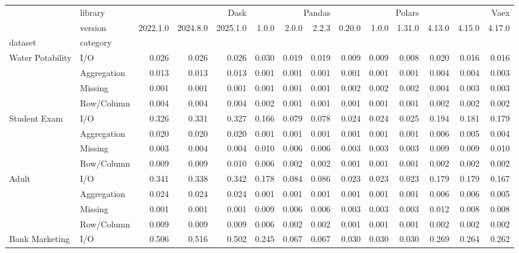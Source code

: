 \begin{tabular}{llrrrrrrrrrrrr}
\toprule
 & library & \multicolumn{3}{r}{Dask} & \multicolumn{3}{r}{Pandas} & \multicolumn{3}{r}{Polars} & \multicolumn{3}{r}{Vaex} \\
 & version & 2022.1.0 & 2024.8.0 & 2025.1.0 & 1.0.0 & 2.0.0 & 2.2.3 & 0.20.0 & 1.0.0 & 1.31.0 & 4.13.0 & 4.15.0 & 4.17.0 \\
dataset & category &  &  &  &  &  &  &  &  &  &  &  &  \\
\midrule
\multirow[t]{4}{*}{Water Potability} & I/O & 0.026 & 0.026 & 0.026 & 0.030 & 0.019 & 0.019 & 0.009 & 0.009 & 0.008 & 0.020 & 0.016 & 0.016 \\
 & Aggregation & 0.013 & 0.013 & 0.013 & 0.001 & 0.001 & 0.001 & 0.001 & 0.001 & 0.001 & 0.004 & 0.004 & 0.003 \\
 & Missing & 0.001 & 0.001 & 0.001 & 0.001 & 0.001 & 0.001 & 0.002 & 0.002 & 0.002 & 0.004 & 0.003 & 0.003 \\
 & Row/Column & 0.004 & 0.004 & 0.004 & 0.002 & 0.001 & 0.001 & 0.001 & 0.001 & 0.001 & 0.002 & 0.002 & 0.002 \\
\cline{1-14}
\multirow[t]{4}{*}{Student Exam} & I/O & 0.326 & 0.331 & 0.327 & 0.166 & 0.079 & 0.078 & 0.024 & 0.024 & 0.025 & 0.194 & 0.181 & 0.179 \\
 & Aggregation & 0.020 & 0.020 & 0.020 & 0.001 & 0.001 & 0.001 & 0.001 & 0.001 & 0.001 & 0.006 & 0.005 & 0.004 \\
 & Missing & 0.003 & 0.004 & 0.004 & 0.010 & 0.006 & 0.006 & 0.003 & 0.003 & 0.003 & 0.009 & 0.009 & 0.010 \\
 & Row/Column & 0.009 & 0.009 & 0.010 & 0.006 & 0.002 & 0.002 & 0.001 & 0.001 & 0.001 & 0.002 & 0.002 & 0.002 \\
\cline{1-14}
\multirow[t]{4}{*}{Adult} & I/O & 0.341 & 0.338 & 0.342 & 0.178 & 0.084 & 0.086 & 0.023 & 0.023 & 0.023 & 0.179 & 0.179 & 0.167 \\
 & Aggregation & 0.024 & 0.024 & 0.024 & 0.001 & 0.001 & 0.001 & 0.001 & 0.001 & 0.001 & 0.006 & 0.006 & 0.005 \\
 & Missing & 0.001 & 0.001 & 0.001 & 0.009 & 0.006 & 0.006 & 0.003 & 0.003 & 0.003 & 0.012 & 0.008 & 0.008 \\
 & Row/Column & 0.009 & 0.009 & 0.009 & 0.006 & 0.002 & 0.002 & 0.001 & 0.001 & 0.001 & 0.002 & 0.002 & 0.002 \\
\cline{1-14}
\multirow[t]{4}{*}{Bank Marketing} & I/O & 0.506 & 0.516 & 0.502 & 0.245 & 0.067 & 0.067 & 0.030 & 0.030 & 0.030 & 0.269 & 0.264 & 0.262 \\

\end{tabular}
